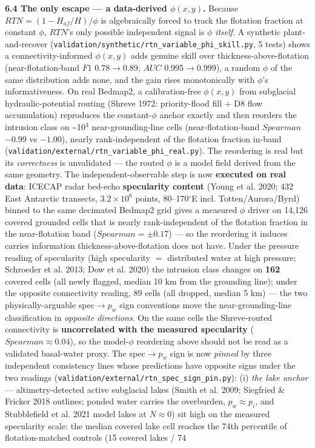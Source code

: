 \documentclass[tc, manuscript]{copernicus}
\begin{document}
\textbf{6.4 The only escape — a data-derived $\phi (x,y)$.} Because $RTN=(1-H_{af}/H)/\phi $ is algebraically forced to track the flotation fraction at constant $\phi $, $RTN$'s only possible independent signal is $\phi $ \emph{itself}. A synthetic plant-and-recover (\texttt{validation/\allowbreak{}synthetic/\allowbreak{}rtn\_\allowbreak{}variable\_\allowbreak{}phi\_\allowbreak{}skill.\allowbreak{}py}, 5 tests) shows a connectivity-informed $\phi (x,y)$ adds genuine skill over thickness-above-flotation (near-flotation-band $F1$ 0.78\ensuremath{\to}0.89; $AUC$ 0.995\ensuremath{\to}0.999), a random $\phi $ of the same distribution adds none, and the gain rises monotonically with $\phi $'s informativeness. On real Bedmap2, a calibration-free $\phi (x,y)$ from subglacial hydraulic-potential routing (Shreve 1972: priority-flood fill + D8 flow accumulation) reproduces the constant-$\phi $ anchor exactly and then reorders the intrusion class on \textasciitilde{}10\ensuremath{^{3}} near-grounding-line cells (near-flotation-band $Spearman$ $-0.99$ vs $-1.00$), nearly rank-independent of the flotation fraction in-band (\texttt{validation/\allowbreak{}external/\allowbreak{}rtn\_\allowbreak{}variable\_\allowbreak{}phi\_\allowbreak{}real.\allowbreak{}py}). The reordering is real but its \emph{correctness} is unvalidated — the routed $\phi $ is a model field derived from the same geometry. The independent-observable step is now \textbf{executed on real data}: ICECAP radar bed-echo \textbf{specularity content} (Young et al. 2020; 432 East Antarctic transects, $3.2\times 10^{6}$ points, 80--170\ensuremath{^{\circ}}E incl. Totten/Aurora/Byrd) binned to the same decimated Bedmap2 grid gives a measured $\phi $ driver on 14{,}126 covered grounded cells that is nearly rank-independent of the flotation fraction in the near-flotation band ($Spearman=\pm 0.17$) — so the reordering it induces carries information thickness-above-flotation does not have. Under the pressure reading of specularity (high specularity $=$ distributed water at high pressure; Schroeder et al. 2013; Dow et al. 2020) the intrusion class changes on \textbf{162} covered cells (all newly flagged, median 10 km from the grounding line); under the opposite connectivity reading, 89 cells (all dropped, median 5 km) — the two physically-arguable spec$\to p_{w}$ sign conventions move the near-grounding-line classification in \emph{opposite directions}. On the same cells the Shreve-routed connectivity is \textbf{uncorrelated with the measured specularity} ($Spearman\approx 0.04$), so the model-$\phi $ reordering above should not be read as a validated basal-water proxy. The spec$\to p_{w}$ sign is now \emph{pinned} by three independent consistency lines whose predictions have opposite signs under the two readings (\texttt{validation/\allowbreak{}external/\allowbreak{}rtn\_\allowbreak{}spec\_\allowbreak{}sign\_\allowbreak{}pin.\allowbreak{}py}): (i) \emph{the lake anchor} — altimetry-detected active subglacial lakes (Smith et al. 2009; Siegfried \& Fricker 2018 outlines; ponded water carries the overburden, $p_{w}\approx p_{i}$, and Stubblefield et al. 2021 model lakes at $N\approx 0$) sit high on the measured specularity scale: the median covered lake cell reaches the 74th percentile of flotation-matched controls (15 covered lakes / 74 
\end{document}
